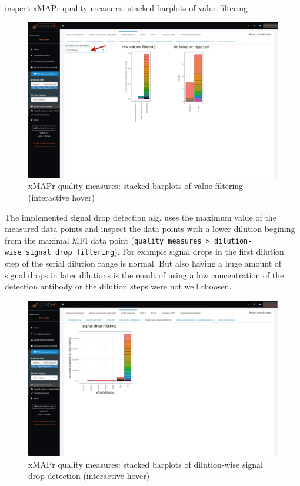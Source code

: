 \documentclass[]{book}
\theoremstyle{definition}
\theoremstyle{definition}
\theoremstyle{definition}
\theoremstyle{remark}
\begin{document}
\href{figures/quality_measures__value_filtering.png}{inspect xMAPr
quality measures: stacked barplots of value filtering}

\begin{figure}
\includegraphics[width=50.47in]{figures/quality_measures__value_filtering1} \caption{xMAPr quality measures: stacked barplots of value filtering (interactive hover)}\label{fig:BarplotsValueFiltering1}
\end{figure}

The implemented signal drop detection alg. uses the maximum value of the
measured data points and inspect the data points with a lower dilution
begining from the maximal MFI data point
(\texttt{quality\ measures\ \textgreater{}\ dilution-wise\ signal\ drop\ filtering}).
For example signal drops in the first dilution step of the serial
dilution range is normal. But also having a huge amount of signal drops
in later dilutions is the result of using a low concentration of the
detection antibody or the dilution steps were not well choosen.

\begin{figure}
\includegraphics[width=50.5in]{figures/quality_measures__value_filtering_signal_drop} \caption{xMAPr quality measures: stacked barplots of dilution-wise signal drop detection (interactive hover)}\label{fig:BarplotsValueFiltering2}
\end{figure}
\end{document}
